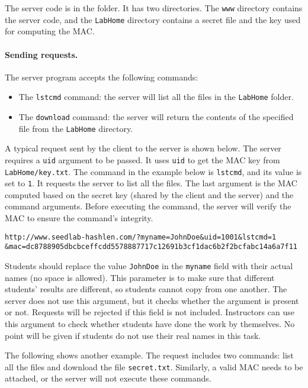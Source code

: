 The server code is in the  folder.
It has two directories.
The \texttt{www} directory contains the server code, and the
\texttt{LabHome} directory contains a secret file and
the key used for computing the MAC.




\paragraph{Sending requests.} The server program accepts the following commands:

\begin{itemize}
\item The \texttt{lstcmd} command: the server will list all the files in the
\texttt{LabHome} folder.
\item The \texttt{download} command: the server will return the contents of the
specified file from the \texttt{LabHome} directory.
\end{itemize}

A typical request sent by the client to the server is shown below.
The server requires a \texttt{uid} argument to be passed. It uses
\texttt{uid} to get the MAC key from
\texttt{LabHome/key.txt}. The command
in the example below is \texttt{lstcmd}, and its value is set to \texttt{1}. It requests
the server to list all the files. The last argument is the MAC computed based on the
secret key (shared by the client and the server) and the command arguments.
Before executing the command, the server will verify the MAC to ensure
the command's integrity.

\begin{lstlisting}
http://www.seedlab-hashlen.com/?myname=JohnDoe&uid=1001&lstcmd=1
&mac=dc8788905dbcbceffcdd5578887717c12691b3cf1dac6b2f2bcfabc14a6a7f11
\end{lstlisting}


Students should replace the value \texttt{JohnDoe} in the
\texttt{myname} field with their actual names (no space
is allowed). This parameter is to make sure that different students'
results are different, so students cannot copy from one
another. The server does not use this argument, but it checks
whether the argument is present or not. Requests will be rejected
if this field is not included.
Instructors
can use this argument to check whether students have done the work by
themselves. No point will be given if students do not use
their real names in this task.


The following shows another example. The request includes
two commands: list all the files and download the
file \texttt{secret.txt}. Similarly, a valid MAC needs to be attached,
or the server will not execute these commands.

